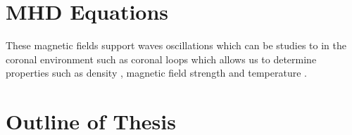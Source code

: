 \documentclass[12pt]{ociamthesis}
\begin{document}
\section{MHD Equations}
\label{section:MHD_eqs}
These magnetic fields support waves oscillations which can be studies to in the coronal environment such as coronal loops which allows us to determine properties such as density \citep{Verwichte_2013A_A}, magnetic field strength \citep{Nakariakov_2001} and temperature \citep{De_Moortel_2003SoPh}.


\section{Outline of Thesis}

\end{document}
